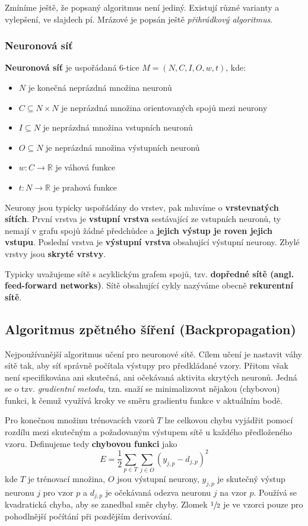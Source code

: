 \documentclass[11pt]{report} %
\newcommand{\R}{\mathbb{R}}
\numberwithin{equation}{section}
\begin{document}
Zmíníme ještě, že popsaný algoritmus není jediný. Existují různé varianty a vylepšení, ve slajdech pí. Mrázové je popsán ještě \textit{přihrádkový algoritmus}.

\subsubsection{Neuronová síť}
\textbf{Neuronová síť} je uspořádaná 6-tice $M=(N,C,I,O,w,t)$, kde:
\begin{itemize}
	
	
	\item $N$ je konečná neprázdná množina neuronů
	\item $C \subseteq N \times N$ je neprázdná množina orientovaných spojů mezi neurony
	\item $I \subseteq N$ je neprázdná množina vstupních neuronů
	\item $O \subseteq N$ je neprázdná množina výstupních neuronů
	\item $w: C \rightarrow \R$ je váhová funkce
	\item $t: N \rightarrow \R$ je prahová funkce
\end{itemize}

Neurony jsou typicky uspořádány do vrstev, pak mluvíme o \textbf{vrstevnatých sítích}. První vrstva je \textbf{vstupní vrstva} sestávající ze vstupních neuronů, ty nemají v grafu spojů žádné předchůdce a \textbf{jejich výstup je roven jejich vstupu}. Poslední vrstva je \textbf{výstupní vrstva} obsahující výstupní neurony. Zbylé vrstvy jsou \textbf{skryté vrstvy}. 

Typicky uvažujeme sítě s acyklickým grafem spojů, tzv. \textbf{dopředné sítě (angl. feed-forward networks)}. Sítě obsahující cykly nazýváme obecně \textbf{rekurentní sítě}.

\subsection{Algoritmus zpětného šíření (Backpropagation)}
Nejpoužívanější algoritmus učení pro neuronové sítě. Cílem učení je nastavit váhy sítě tak, aby síť správně počítala výstupy pro předkládané vzory. Přitom však není specifikována ani skutečná, ani očekávaná aktivita skrytých neuronů. Jedná se o tzv. \textit{gradientní metodu}, tzn. snaží se minimalizovat nějakou (chybovou) funkci, k čemuž využívá kroky ve směru gradientu funkce v aktuálním bodě.

Pro konečnou množinu trénovacích vzorů $T$ lze celkovou chybu vyjádřit pomocí rozdílu mezi skutečným a
požadovaným výstupem sítě u každého předloženého vzoru. Definujeme tedy \textbf{chybovou funkci} jako
$$E = \frac{1}{2} \sum\limits_{p \in T}\sum\limits_{j\in O}(y_{j,p} - d_{j,p})^2$$
kde $T$ je trénovací množina, $O$ jsou výstupní neurony, $y_{j,p}$ je skutečný výstup neuronu $j$ pro vzor $p$ a $d_{j,p}$ je očekávaná odezva neuronu $j$ na vzor $p$. Používá se kvadratická chyba, aby se zanedbal směr chyby. Zlomek $\sfrac{1}{2}$ je ve vzorci pouze pro pohodlnější počítání při pozdějším derivování. 
\end{document}
